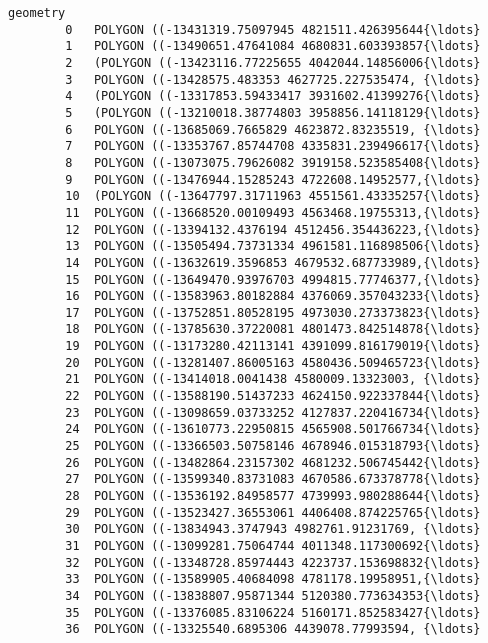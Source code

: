\documentclass[11pt]{article}
\begin{document}
\begin{Verbatim}[commandchars=\\\{\}]
                                                     geometry  
        0   POLYGON ((-13431319.75097945 4821511.426395644{\ldots}  
        1   POLYGON ((-13490651.47641084 4680831.603393857{\ldots}  
        2   (POLYGON ((-13423116.77225655 4042044.14856006{\ldots}  
        3   POLYGON ((-13428575.483353 4627725.227535474, {\ldots}  
        4   (POLYGON ((-13317853.59433417 3931602.41399276{\ldots}  
        5   (POLYGON ((-13210018.38774803 3958856.14118129{\ldots}  
        6   POLYGON ((-13685069.7665829 4623872.83235519, {\ldots}  
        7   POLYGON ((-13353767.85744708 4335831.239496617{\ldots}  
        8   POLYGON ((-13073075.79626082 3919158.523585408{\ldots}  
        9   POLYGON ((-13476944.15285243 4722608.14952577,{\ldots}  
        10  (POLYGON ((-13647797.31711963 4551561.43335257{\ldots}  
        11  POLYGON ((-13668520.00109493 4563468.19755313,{\ldots}  
        12  POLYGON ((-13394132.4376194 4512456.354436223,{\ldots}  
        13  POLYGON ((-13505494.73731334 4961581.116898506{\ldots}  
        14  POLYGON ((-13632619.3596853 4679532.687733989,{\ldots}  
        15  POLYGON ((-13649470.93976703 4994815.77746377,{\ldots}  
        16  POLYGON ((-13583963.80182884 4376069.357043233{\ldots}  
        17  POLYGON ((-13752851.80528195 4973030.273373823{\ldots}  
        18  POLYGON ((-13785630.37220081 4801473.842514878{\ldots}  
        19  POLYGON ((-13173280.42113141 4391099.816179019{\ldots}  
        20  POLYGON ((-13281407.86005163 4580436.509465723{\ldots}  
        21  POLYGON ((-13414018.0041438 4580009.13323003, {\ldots}  
        22  POLYGON ((-13588190.51437233 4624150.922337844{\ldots}  
        23  POLYGON ((-13098659.03733252 4127837.220416734{\ldots}  
        24  POLYGON ((-13610773.22950815 4565908.501766734{\ldots}  
        25  POLYGON ((-13366503.50758146 4678946.015318793{\ldots}  
        26  POLYGON ((-13482864.23157302 4681232.506745442{\ldots}  
        27  POLYGON ((-13599340.83731083 4670586.673378778{\ldots}  
        28  POLYGON ((-13536192.84958577 4739993.980288644{\ldots}  
        29  POLYGON ((-13523427.36553061 4406408.874225765{\ldots}  
        30  POLYGON ((-13834943.3747943 4982761.91231769, {\ldots}  
        31  POLYGON ((-13099281.75064744 4011348.117300692{\ldots}  
        32  POLYGON ((-13348728.85974443 4223737.153698832{\ldots}  
        33  POLYGON ((-13589905.40684098 4781178.19958951,{\ldots}  
        34  POLYGON ((-13838807.95871344 5120380.773634353{\ldots}  
        35  POLYGON ((-13376085.83106224 5160171.852583427{\ldots}  
        36  POLYGON ((-13325540.6895306 4439078.77993594, {\ldots}  

\end{Verbatim}
\end{document}
